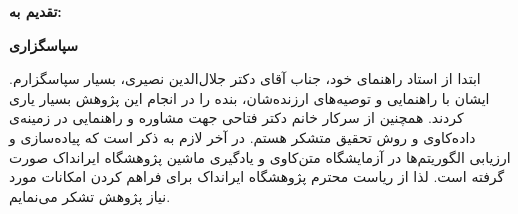 \thispagestyle{empty}

\noindent
\textbf{\Large تقدیم به:}
\vskip 1cm

\newpage
\thispagestyle{empty}

\begin{center}
\textbf{\Large سپاسگزاری}
\end{center}
\vskip 1cm
\noindent ابتدا از استاد راهنمای خود، جناب آقای دکتر جلال‌الدین نصیری، بسیار سپاسگزارم. ایشان با راهنمایی و توصیه‌های ارزنده‌شان، بنده را در انجام این پژوهش بسیار یاری کردند. همچنین از سرکار خانم دکتر فتاحی  جهت مشاوره و راهنمایی در زمینه‌ی داده‌کاوی و روش تحقیق متشکر هستم. در آخر لازم به ذکر است که پیاده‌سازی و ارزیابی الگوریتم‌ها در آزمایشگاه متن‌کاوی و یادگیری ماشین  پژوهشگاه ایرانداک صورت گرفته است. لذا از ریاست محترم پژوهشگاه ایرانداک برای فراهم کردن امکانات مورد نیاز پژوهش تشکر می‌نمایم. 

\vskip 1cm
